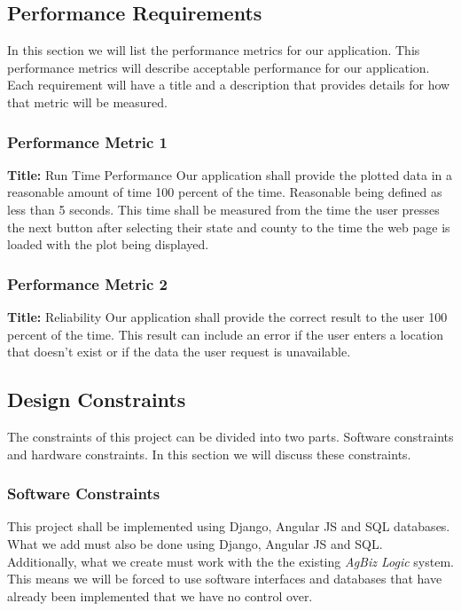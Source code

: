 \documentclass[onecolumn, draftclsnofoot,10pt, compsoc]{article}
\begin{document}
    \subsection{Performance Requirements}
    	In this section we will list the performance metrics for our application. This performance metrics will describe acceptable performance for our application. Each requirement will have a title and a description that provides details for how that metric will be measured.
				\subsubsection{Performance Metric 1}
               	\textbf{Title:} Run Time Performance \hfill \break
                Our application shall provide the plotted data in a reasonable amount of time 100 percent of the time. Reasonable being defined as less than 5 seconds. This time shall be measured from the time the user presses the next button after selecting their state and county to the time the web page is loaded with the plot being displayed.\\
                \subsubsection{Performance Metric 2}
                \textbf{Title:} Reliability \hfill \break
                Our application shall provide the correct result to the user 100 percent of the time. This result can include an error if the user enters a location that doesn't exist or if the data the user request is unavailable.\\

    \subsection{Design Constraints}
			The constraints of this project can be divided into two parts. Software constraints and hardware constraints. In this section we will discuss these constraints.\\
			\subsubsection{Software Constraints}
				This project shall be implemented using Django, Angular JS and SQL databases. What we add must also be done using Django, Angular JS and SQL.\\

				Additionally, what we create must work with the the existing \textit{AgBiz Logic} system. This means we will be forced to use software interfaces and databases that have already been implemented that we have no control over.\\
\end{document}
